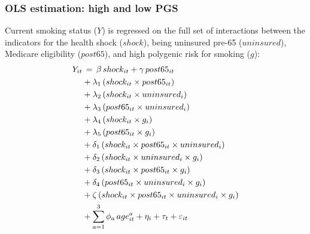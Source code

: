 \subsubsection{OLS estimation: high and low PGS}
Current smoking status ($Y$) is regressed on the full set of interactions between the indicators for the health shock ($shock$), being uninsured pre-65 ($uninsured$), Medicare eligibility ($post65$), and high polygenic risk for smoking ($g$):
	\begin{align*} \label{eq:reg2}
	Y_{it}& \thinspace  = \thinspace
	\beta \thinspace shock_{it} + \gamma \thinspace post65_{it} \\
	&+\lambda_1 \thinspace  (shock_{it} \times post65_{it}) \nonumber \\
	&+ \lambda_2 \thinspace (shock_{it} \times uninsured_i) \nonumber \\
	&+\lambda_3  \thinspace (post65_{it} \times uninsured_i) \nonumber \\
	&+ \lambda_4 \thinspace (shock_{it} \times g_i) \nonumber \\
	&+\lambda_5 \thinspace (post65_{it} \times g_i) \nonumber \\
	&+ \delta_1 \thinspace (shock_{it} \times post65_{it} \times uninsured_i) \nonumber \\
	&+ \delta_2 \thinspace (shock_{it} \times uninsured_i \times g_i) \nonumber \\
	&+ \delta_3 \thinspace (shock_{it} \times post65_{it} \times g_i) \nonumber \\
	&+ \delta_4 \thinspace (post65_{it} \times uninsured_i \times g_i) \nonumber\\
	&+ \zeta \thinspace (shock_{it} \times post65_{it} \times uninsured_i \times g_i) \nonumber \\
	&+ \sum_{a=1}^3 \phi_a \thinspace age_{it}^{a} + \eta_i + \tau_t + \varepsilon_{it} \nonumber
	\end{align*}

